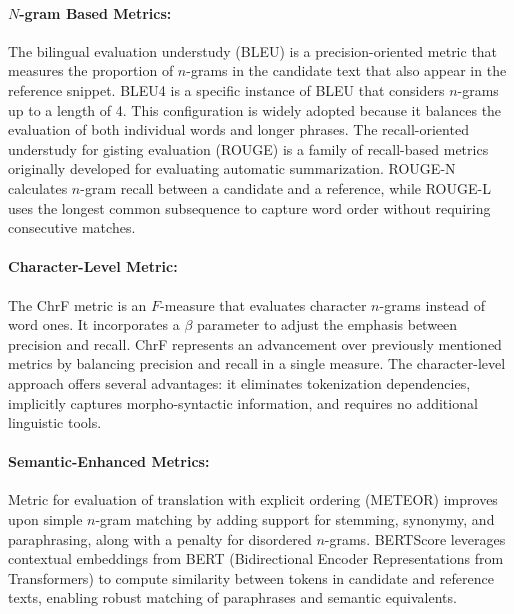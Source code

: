 \begin{sloppypar}
\paragraph{\(N\)-gram Based Metrics:} The bilingual evaluation understudy (BLEU) \parencite{papineni2002} is a precision-oriented metric that measures the proportion of \(n\)-grams in the candidate text that also appear in the reference snippet. BLEU4 is a specific instance of BLEU that considers \(n\)-grams up to a length of 4. This configuration is widely adopted because it balances the evaluation of both individual words and longer phrases. The recall-oriented understudy for gisting evaluation (ROUGE) \parencite{lin2004} is a family of recall-based metrics originally developed for evaluating automatic summarization. ROUGE-N calculates \(n\)-gram recall between a candidate and a reference, while ROUGE-L uses the longest common subsequence to capture word order without requiring consecutive matches.
\end{sloppypar}

\begin{sloppypar}
\paragraph{Character-Level Metric:} The ChrF metric \parencite{popovic2015} is an \(F\)-measure that evaluates character \(n\)-grams instead of word ones. It incorporates a \(\beta\) parameter to adjust the emphasis between precision and recall. ChrF represents an advancement over previously mentioned metrics by balancing precision and recall in a single measure. The character-level approach offers several advantages: it eliminates tokenization dependencies, implicitly captures morpho-syntactic information, and requires no additional linguistic tools.
\end{sloppypar}

\paragraph{Semantic-Enhanced Metrics:} Metric for evaluation of translation with explicit ordering (METEOR) \parencite{banarjee2005} improves upon simple \(n\)-gram matching by adding support for stemming, synonymy, and paraphrasing, along with a penalty for disordered \(n\)-grams. BERTScore \parencite{zhang2019} leverages contextual embeddings from BERT (Bidirectional Encoder Representations from Transformers) to compute similarity between tokens in candidate and reference texts, enabling robust matching of paraphrases and semantic equivalents.

